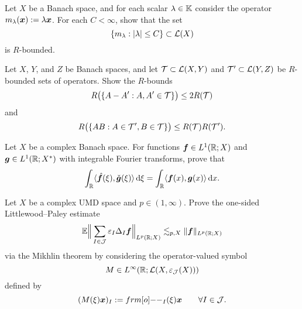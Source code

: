 \begin{exercise}\label{ex:scalars}
  Let $X$ be a Banach space, and for each scalar $\lambda \in \mathbb{K}$ consider the operator $m_{\lambda}(\bm{x}) := \lambda \bm{x}$.
  For each $C < \infty$, show that the set
  \begin{equation*}
    \{m_{\lambda} : |\lambda| \leq C\} \subset \mathcal{L}(X)
  \end{equation*}
  is $R$-bounded.
\end{exercise}

\begin{exercise}\label{ex:R-bound-stuff}
  Let $X$, $Y$, and $Z$ be Banach spaces, and let $\mathcal{T} \subset \mathcal{L}(X,Y)$ and $\mathcal{T}' \subset \mathcal{L}(Y,Z)$ be $R$-bounded sets of operators.
  Show the $R$-bounds
  \begin{equation*}
    R\big(\{A - A' : A,A' \in \mathcal{T}\} \big) \leq 2R(\mathcal{T})
  \end{equation*}
  and
  \begin{equation*}
    R\big(\{AB : A \in \mathcal{T}', B \in \mathcal{T}\}\big) \leq R(\mathcal{T})R(\mathcal{T}').
  \end{equation*}
\end{exercise}

\begin{exercise}\label{ex:fourier-inversion}
  Let $X$ be a complex Banach space.
  For functions $\bm{f} \in L^1(\mathbb{R};X)$ and $\bm{g} \in L^1(\mathbb{R};X^{*})$ with integrable Fourier transforms, prove that
  \begin{equation*}
    \int_{\mathbb{R}} \langle \hat{\bm{f}}(\xi), \check{\bm{g}}(\xi) \rangle \, \mathrm{d}\xi
    = \int_{\mathbb{R}} \langle \bm{f}(x), \bm{g}(x) \rangle \, \mathrm{d} x.
  \end{equation*}
\end{exercise}

\begin{exercise}\label{ex:LP-op-2}
  Let $X$ be a complex UMD space and $p \in (1,\infty)$.
  Prove the one-sided Littlewood--Paley estimate
  \begin{equation*}
    \mathbb{E} \Big\| \sum_{I \in \mathcal{J}} \varepsilon_{I} \Delta_{I} \bm{f} \Big\|_{L^p(\mathbb{R};X)} \lesssim_{p,X} \|\bm{f}\|_{L^p(\mathbb{R};X)}
  \end{equation*}
  via the Mikhlin theorem by considering the operator-valued symbol
  \begin{equation*}
    M \in L^\infty(\mathbb{R}; \mathcal{L}(X, \varepsilon_{\mathcal{J}}(X)))
  \end{equation*}
  defined by
  \begin{equation*}
    (M(\xi)\mb{x})_{I} := \1_{I}(\xi)\mb{x} \qquad \forall I \in \mc{J}.
  \end{equation*}
\end{exercise}


